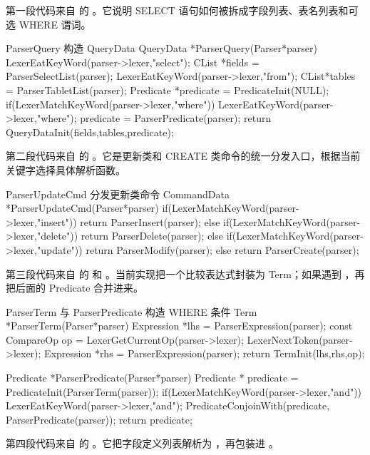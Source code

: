 第一段代码来自  的 。它说明 SELECT 语句如何被拆成字段列表、表名列表和可选 WHERE 谓词。

\begin{dbcode}{ParserQuery 构造 QueryData}
QueryData *ParserQuery(Parser*parser){
    LexerEatKeyWord(parser->lexer,"select");
    CList *fields = ParserSelectList(parser);
    LexerEatKeyWord(parser->lexer,"from");
    CList*tables = ParserTabletList(parser);
    Predicate *predicate = PredicateInit(NULL);
    if(LexerMatchKeyWord(parser->lexer,"where")){
        LexerEatKeyWord(parser->lexer,"where");
        predicate = ParserPredicate(parser);
    }
    return QueryDataInit(fields,tables,predicate);
}
\end{dbcode}

第二段代码来自  的 。它是更新类和 CREATE 类命令的统一分发入口，根据当前关键字选择具体解析函数。

\begin{dbcode}{ParserUpdateCmd 分发更新类命令}
CommandData *ParserUpdateCmd(Parser*parser){
    if(LexerMatchKeyWord(parser->lexer,"insert")){
        return ParserInsert(parser);
    }else if(LexerMatchKeyWord(parser->lexer,"delete")){
        return ParserDelete(parser);
    }else if(LexerMatchKeyWord(parser->lexer,"update")){
        return ParserModify(parser);
    }else{
        return ParserCreate(parser);
    }
}
\end{dbcode}

第三段代码来自  的  和 。当前实现把一个比较表达式封装为 Term；如果遇到 ，再把后面的 Predicate 合并进来。

\begin{dbcode}{ParserTerm 与 ParserPredicate 构造 WHERE 条件}
Term *ParserTerm(Parser*parser){
    Expression *lhs = ParserExpression(parser);
    const CompareOp op = LexerGetCurrentOp(parser->lexer);
    LexerNextToken(parser->lexer);
    Expression *rhs = ParserExpression(parser);
    return TermInit(lhs,rhs,op);
}

Predicate *ParserPredicate(Parser*parser){
    Predicate * predicate = PredicateInit(ParserTerm(parser));
    if(LexerMatchKeyWord(parser->lexer,"and")){
        LexerEatKeyWord(parser->lexer,"and");
        PredicateConjoinWith(predicate, ParserPredicate(parser));
    }
    return predicate;
}
\end{dbcode}

第四段代码来自  的 。它把字段定义列表解析为 ，再包装进 。

